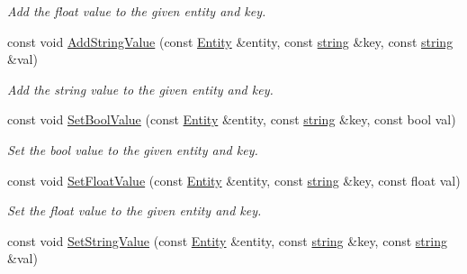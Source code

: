 \begin{DoxyCompactItemize}
\begin{DoxyCompactList}\small\item\em Add the float value to the given entity and key. \end{DoxyCompactList}\item 
const void \hyperlink{class_ensum_1_1_components_1_1_data_manager_a0916658dd49bbf814965bfce50767906}{Add\+String\+Value} (const \hyperlink{struct_ensum_1_1_components_1_1_entity}{Entity} \&entity, const \hyperlink{class_ensum_1_1string}{string} \&key, const \hyperlink{class_ensum_1_1string}{string} \&val)\hypertarget{class_ensum_1_1_components_1_1_data_manager_a0916658dd49bbf814965bfce50767906}{}\label{class_ensum_1_1_components_1_1_data_manager_a0916658dd49bbf814965bfce50767906}

\begin{DoxyCompactList}\small\item\em Add the string value to the given entity and key. \end{DoxyCompactList}\item 
const void \hyperlink{class_ensum_1_1_components_1_1_data_manager_a2ef6ead291f631e756b19971e1391acf}{Set\+Bool\+Value} (const \hyperlink{struct_ensum_1_1_components_1_1_entity}{Entity} \&entity, const \hyperlink{class_ensum_1_1string}{string} \&key, const bool val)\hypertarget{class_ensum_1_1_components_1_1_data_manager_a2ef6ead291f631e756b19971e1391acf}{}\label{class_ensum_1_1_components_1_1_data_manager_a2ef6ead291f631e756b19971e1391acf}

\begin{DoxyCompactList}\small\item\em Set the bool value to the given entity and key. \end{DoxyCompactList}\item 
const void \hyperlink{class_ensum_1_1_components_1_1_data_manager_aecdd69439279eb2f1fb68250085ffc3a}{Set\+Float\+Value} (const \hyperlink{struct_ensum_1_1_components_1_1_entity}{Entity} \&entity, const \hyperlink{class_ensum_1_1string}{string} \&key, const float val)\hypertarget{class_ensum_1_1_components_1_1_data_manager_aecdd69439279eb2f1fb68250085ffc3a}{}\label{class_ensum_1_1_components_1_1_data_manager_aecdd69439279eb2f1fb68250085ffc3a}

\begin{DoxyCompactList}\small\item\em Set the float value to the given entity and key. \end{DoxyCompactList}\item 
const void \hyperlink{class_ensum_1_1_components_1_1_data_manager_a97f2560a6bfd6da8c7708737680f8607}{Set\+String\+Value} (const \hyperlink{struct_ensum_1_1_components_1_1_entity}{Entity} \&entity, const \hyperlink{class_ensum_1_1string}{string} \&key, const \hyperlink{class_ensum_1_1string}{string} \&val)\hypertarget{class_ensum_1_1_components_1_1_data_manager_a97f2560a6bfd6da8c7708737680f8607}{}\label{class_ensum_1_1_components_1_1_data_manager_a97f2560a6bfd6da8c7708737680f8607}


\end{DoxyCompactItemize}
